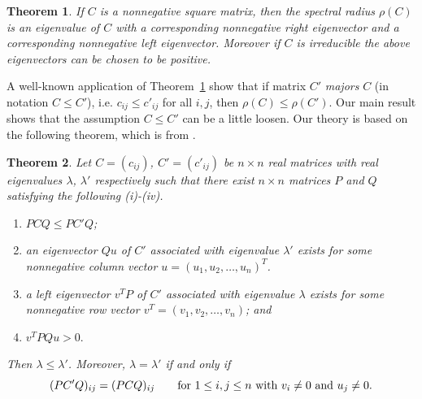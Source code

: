 \documentclass[12pt, a4paper]{article}
\theoremstyle{plain}
\newtheorem{thm}{Theorem}[section]
\theoremstyle{definition}
\begin{document}
\begin{thm} \cite{prn_fros2} \label{thm:Perron_Frobenius}
    If $C$ is a nonnegative square matrix, then the spectral radius $\rho(C)$ is an
    eigenvalue of $C$ with a corresponding nonnegative right eigenvector and a
    corresponding nonnegative left eigenvector.
    Moreover if $C$ is irreducible the above eigenvectors can be chosen to be positive. 
\end{thm}




 A well-known application of Theorem~\ref{thm:Perron_Frobenius}
 show that if matrix  $C'$ {\it majors} $C$ (in notation $C\leq C'$),
 i.e. $c_{ij}\leq c'_{ij}$ for all $i,j$, then $\rho(C)\leq \rho(C')$.
Our main result shows that the assumption $C\leq C'$ can be a little loosen. 
Our theory is based on the following theorem, which is from \cite{chang}. 





\begin{thm}\label{pre_thm}
    Let $C=(c_{ij})$, $C'=(c'_{ij})$  be $n\times n$ real matrices
     with real eigenvalues $\lambda$, $\lambda'$ respectively such
     that there exist $n\times n$ matrices $P$ and $Q$   satisfying the following (i)-(iv).
\begin{enumerate}[label=(\roman*)]
    \item \label{pre_thm_em1}  $PCQ\leq PC'Q$;
    \item \label{pre_thm_em2} an eigenvector $Qu$ of $C'$  associated with
     eigenvalue $\lambda'$ exists for some nonnegative column vector
      $u=(u_1, u_2, \ldots, u_n)^T$.
    \item \label{pre_thm_em3} a left eigenvector $v^TP$ of $C'$ associated
     with eigenvalue $\lambda$ exists for some nonnegative row vector
     $v^T=(v_1, v_2, \ldots, v_n)$; and
    \item \label{pre_thm_em4} $v^TPQu>0.$
\end{enumerate}
    Then $\lambda\leq \lambda'$. Moreover, $\lambda=\lambda'$ if and only if
    \begin{equation}\label{pre0}
        (PC'Q)_{ij}=(PCQ)_{ij}\qquad \hbox{for~}1\leq i, j\leq n \hbox{~with~} v_i\ne 0 \hbox{~and~} u_j\ne 0.
    \end{equation}
\end{thm}
\end{document}
